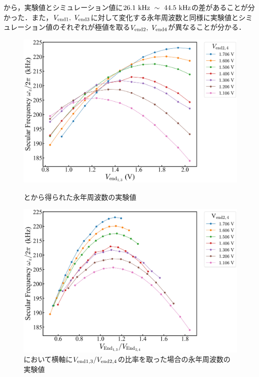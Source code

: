 から，実験値とシミュレーション値に$26.1 \ {\rm kHz} \ \sim \ 44.5 \ {\rm kHz}$の差があることが分かった．また，$V_{\rm end1}, \ V_{\rm end3}$に対して変化する永年周波数と同様に実験値とシミュレーション値のそれぞれが極値を取る$V_{\rm end2}, \ V_{\rm end4}$が異なることが分かる．

\clearpage

\begin{figure}[h]
	\begin{minipage}{0.5\linewidth}
		\begin{center}
			\includegraphics[width = 0.98\columnwidth]{./results/figure/Vendodd-SecFreqZ_Vendeven.jpg}
			\caption{とから得られた永年周波数の実験値}
			\label{fig:Vendodd_Vendeven}
		\end{center}
	\end{minipage}
	\begin{minipage}{0.5\linewidth}
		\begin{center}
			\includegraphics[width = 0.98\columnwidth]{./results/figure/Vendodd_Vendeven-SecFreqZ_.jpg}
			\caption{において横軸に$V_{\rm end1,3}/V_{\rm end2,4}$の比率を取った場合の永年周波数の実験値}
			\label{fig:Vendodd_Vendeven_f}
		\end{center}
	\end{minipage}
\end{figure}

